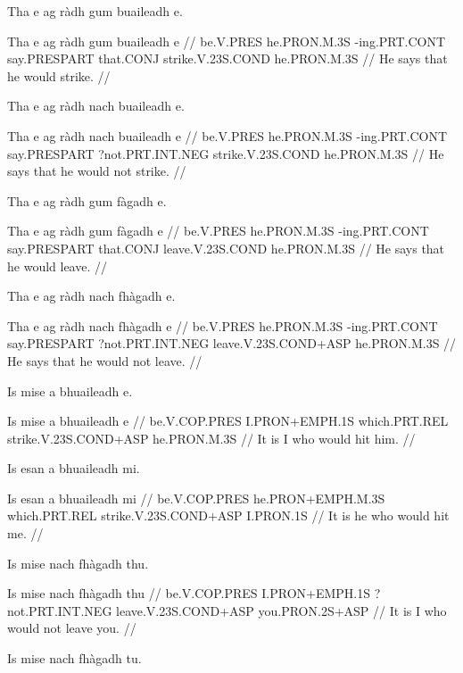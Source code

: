 \documentclass[a4paper,10pt]{article}
\begin{document}
\ex
\begingl
\glpre Tha e ag ràdh gum buaileadh e. 

\vspace{4mm}
\gla Tha e ag ràdh gum buaileadh e  //
\glb be.V.PRES he.PRON.M.3S -ing.PRT.CONT say.PRESPART that.CONJ strike.V.23S.COND he.PRON.M.3S  //
\glft He says that he would strike. //
\endgl
\xe

\ex
\begingl
\glpre Tha e ag ràdh nach buaileadh e. 

\vspace{4mm}
\gla Tha e ag ràdh nach buaileadh e  //
\glb be.V.PRES he.PRON.M.3S -ing.PRT.CONT say.PRESPART ?not.PRT.INT.NEG strike.V.23S.COND he.PRON.M.3S  //
\glft He says that he would not strike. //
\endgl
\xe

\ex
\begingl
\glpre Tha e ag ràdh gum fàgadh e. 

\vspace{4mm}
\gla Tha e ag ràdh gum fàgadh e  //
\glb be.V.PRES he.PRON.M.3S -ing.PRT.CONT say.PRESPART that.CONJ leave.V.23S.COND he.PRON.M.3S  //
\glft He says that he would leave. //
\endgl
\xe

\ex
\begingl
\glpre Tha e ag ràdh nach fhàgadh e. 

\vspace{4mm}
\gla Tha e ag ràdh nach fhàgadh e  //
\glb be.V.PRES he.PRON.M.3S -ing.PRT.CONT say.PRESPART ?not.PRT.INT.NEG leave.V.23S.COND+ASP he.PRON.M.3S  //
\glft He says that he would not leave. //
\endgl
\xe

\ex
\begingl
\glpre Is mise a bhuaileadh e. 

\vspace{4mm}
\gla Is mise a bhuaileadh e  //
\glb be.V.COP.PRES I.PRON+EMPH.1S which.PRT.REL strike.V.23S.COND+ASP he.PRON.M.3S  //
\glft It is I who would hit him. //
\endgl
\xe

\ex
\begingl
\glpre Is esan a bhuaileadh mi. 

\vspace{4mm}
\gla Is esan a bhuaileadh mi  //
\glb be.V.COP.PRES he.PRON+EMPH.M.3S which.PRT.REL strike.V.23S.COND+ASP I.PRON.1S  //
\glft It is he who would hit me. //
\endgl
\xe

\ex
\begingl
\glpre Is mise nach fhàgadh thu. 

\vspace{4mm}
\gla Is mise nach fhàgadh thu  //
\glb be.V.COP.PRES I.PRON+EMPH.1S ?not.PRT.INT.NEG leave.V.23S.COND+ASP you.PRON.2S+ASP  //
\glft It is I who would not leave you. //
\endgl
\xe

\ex
\begingl
\glpre Is mise nach fhàgadh tu. 
\end{document}
